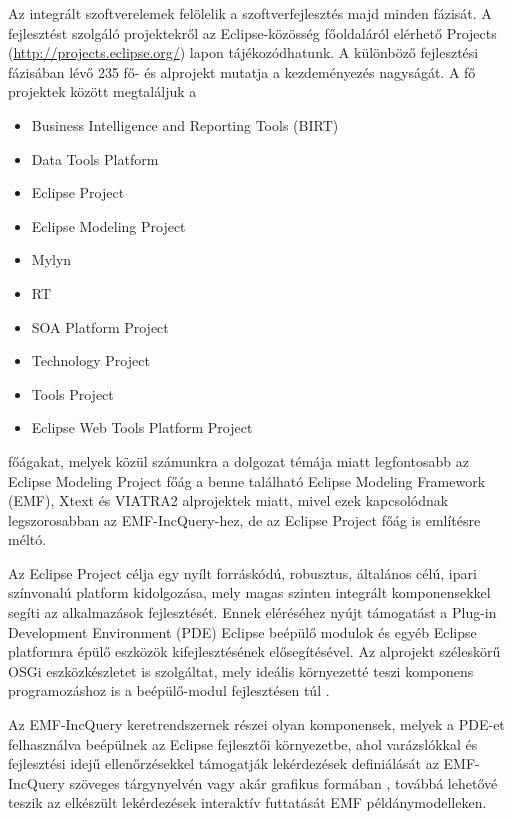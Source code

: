 Az integrált szoftverelemek felölelik a szoftverfejlesztés majd minden fázisát.
A fejlesztést szolgáló projektekről az Eclipse-közösség főoldaláról elérhető Projects (\url{http://projects.eclipse.org/}) lapon tájékozódhatunk.
A különböző fejlesztési fázisában lévő 235 fő- és alprojekt mutatja a kezdeményezés nagyságát.
A fő projektek között megtaláljuk a
\begin{itemize}
    \item Business Intelligence and Reporting Tools (BIRT)
    \item Data Tools Platform
    \item Eclipse Project
    \item Eclipse Modeling Project
    \item Mylyn
    \item RT
    \item SOA Platform Project
    \item Technology Project 
    \item Tools Project
    \item Eclipse Web Tools Platform Project
\end{itemize}
főágakat, melyek közül számunkra a dolgozat témája miatt legfontosabb az Eclipse Modeling Project főág a benne található Eclipse Modeling Framework (\gls{EMF}), \mbox{Xtext} és \mbox{VIATRA2} alprojektek miatt, mivel ezek kapcsolódnak legszorosabban az EMF-IncQuery-hez, de az Eclipse Project főág is említésre méltó.

Az Eclipse Project célja egy nyílt forráskódú, robusztus, általános célú, ipari színvonalú platform kidolgozása, mely magas szinten integrált komponensekkel segíti az alkalmazások fejlesztését.
Ennek eléréséhez nyújt támogatást a Plug-in Development Environment (PDE) Eclipse beépülő modulok és egyéb Eclipse platformra épülő eszközök kifejlesztésének elősegítésével.
Az alprojekt széleskörű \gls{OSGi} eszközkészletet is szolgáltat, mely ideális környezetté teszi komponens programozáshoz is a beépülő-modul fejlesztésen túl \cite{EclipseOrgPDE}.

Az EMF-IncQuery keretrendszernek részei olyan komponensek, melyek a PDE-et felhasználva beépülnek az Eclipse fejlesztői környezetbe, ahol varázslókkal és fejlesztési idejű ellenőrzésekkel támogatják lekérdezések definiálását az EMF-IncQuery szöveges tárgynyelvén vagy akár grafikus formában \cite{Gyorok13}, továbbá lehetővé teszik az elkészült lekérdezések interaktív futtatását \gls{EMF} példánymodelleken.


